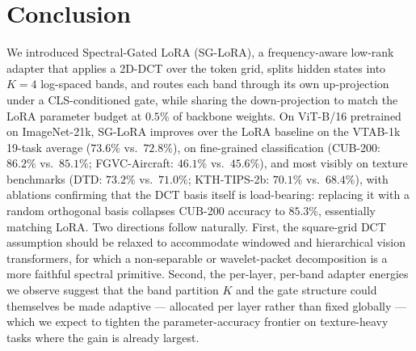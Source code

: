 \documentclass{article}
\begin{document}
\section{Conclusion}
We introduced Spectral-Gated LoRA (SG-LoRA), a frequency-aware low-rank adapter that applies a 2D-DCT over the token grid, splits hidden states into $K=4$ log-spaced bands, and routes each band through its own up-projection under a CLS-conditioned gate, while sharing the down-projection to match the LoRA parameter budget at $0.5\%$ of backbone weights. On ViT-B/16 pretrained on ImageNet-21k, SG-LoRA improves over the LoRA baseline on the VTAB-1k 19-task average ($73.6\%$ vs.\ $72.8\%$), on fine-grained classification (CUB-200: $86.2\%$ vs.\ $85.1\%$; FGVC-Aircraft: $46.1\%$ vs.\ $45.6\%$), and most visibly on texture benchmarks (DTD: $73.2\%$ vs.\ $71.0\%$; KTH-TIPS-2b: $70.1\%$ vs.\ $68.4\%$), with ablations confirming that the DCT basis itself is load-bearing: replacing it with a random orthogonal basis collapses CUB-200 accuracy to $85.3\%$, essentially matching LoRA. Two directions follow naturally. First, the square-grid DCT assumption should be relaxed to accommodate windowed and hierarchical vision transformers, for which a non-separable or wavelet-packet decomposition is a more faithful spectral primitive. Second, the per-layer, per-band adapter energies we observe suggest that the band partition $K$ and the gate structure could themselves be made adaptive — allocated per layer rather than fixed globally — which we expect to tighten the parameter-accuracy frontier on texture-heavy tasks where the gain is already largest.



\end{document}
